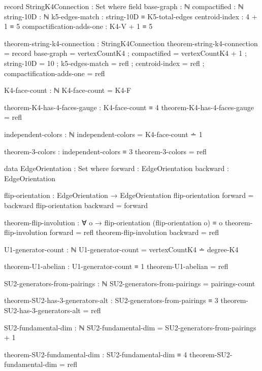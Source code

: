 \documentclass[11pt,a4paper]{book}
\begin{document}
\begin{code}
record StringK4Connection : Set where
  field
    base-graph : ℕ
    compactified : ℕ
    string-10D : ℕ
    k5-edges-match : string-10D ≡ K5-total-edges
    centroid-index : 4 + 1 ≡ 5
    compactification-adds-one : K4-V + 1 ≡ 5

theorem-string-k4-connection : StringK4Connection
theorem-string-k4-connection = record
  { base-graph = vertexCountK4
  ; compactified = vertexCountK4 + 1
  ; string-10D = 10
  ; k5-edges-match = refl
  ; centroid-index = refl
  ; compactification-adds-one = refl
  }
\end{code}

\begin{code}
K4-face-count : ℕ
K4-face-count = K4-F

theorem-K4-has-4-faces-gauge : K4-face-count ≡ 4
theorem-K4-has-4-faces-gauge = refl

independent-colors : ℕ
independent-colors = K4-face-count ∸ 1

theorem-3-colors : independent-colors ≡ 3
theorem-3-colors = refl
\end{code}

\begin{code}
data EdgeOrientation : Set where
  forward  : EdgeOrientation
  backward : EdgeOrientation

flip-orientation : EdgeOrientation → EdgeOrientation
flip-orientation forward  = backward
flip-orientation backward = forward

theorem-flip-involution : ∀ o → flip-orientation (flip-orientation o) ≡ o
theorem-flip-involution forward  = refl
theorem-flip-involution backward = refl

U1-generator-count : ℕ
U1-generator-count = vertexCountK4 ∸ degree-K4

theorem-U1-abelian : U1-generator-count ≡ 1
theorem-U1-abelian = refl
\end{code}

\begin{code}
SU2-generators-from-pairings : ℕ
SU2-generators-from-pairings = pairings-count

theorem-SU2-has-3-generators-alt : SU2-generators-from-pairings ≡ 3
theorem-SU2-has-3-generators-alt = refl

SU2-fundamental-dim : ℕ
SU2-fundamental-dim = SU2-generators-from-pairings + 1

theorem-SU2-fundamental-dim : SU2-fundamental-dim ≡ 4
theorem-SU2-fundamental-dim = refl
\end{code}
\end{document}
